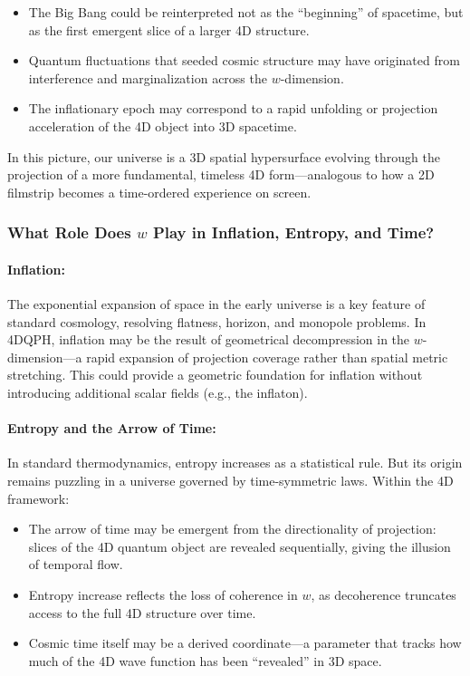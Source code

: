 \documentclass[12pt]{article}
\begin{document}
\begin{itemize}
    \item The Big Bang could be reinterpreted not as the “beginning” of spacetime, but as the first emergent slice of a larger 4D structure.
    \item Quantum fluctuations that seeded cosmic structure may have originated from interference and marginalization across the \( w \)-dimension.
    \item The inflationary epoch may correspond to a rapid unfolding or projection acceleration of the 4D object into 3D spacetime.
\end{itemize}

In this picture, our universe is a 3D spatial hypersurface evolving through the projection of a more fundamental, timeless 4D form—analogous to how a 2D filmstrip becomes a time-ordered experience on screen.

\subsubsection*{What Role Does \( w \) Play in Inflation, Entropy, and Time?}

\paragraph{Inflation:}
The exponential expansion of space in the early universe is a key feature of standard cosmology, resolving flatness, horizon, and monopole problems. In 4DQPH, inflation may be the result of geometrical decompression in the \( w \)-dimension—a rapid expansion of projection coverage rather than spatial metric stretching. This could provide a geometric foundation for inflation without introducing additional scalar fields (e.g., the inflaton).

\paragraph{Entropy and the Arrow of Time:}
In standard thermodynamics, entropy increases as a statistical rule. But its origin remains puzzling in a universe governed by time-symmetric laws. Within the 4D framework:
\begin{itemize}
    \item The arrow of time may be emergent from the directionality of projection: slices of the 4D quantum object are revealed sequentially, giving the illusion of temporal flow.
    \item Entropy increase reflects the loss of coherence in \( w \), as decoherence truncates access to the full 4D structure over time.
    \item Cosmic time itself may be a derived coordinate—a parameter that tracks how much of the 4D wave function has been “revealed” in 3D space.
\end{itemize}
\end{document}
